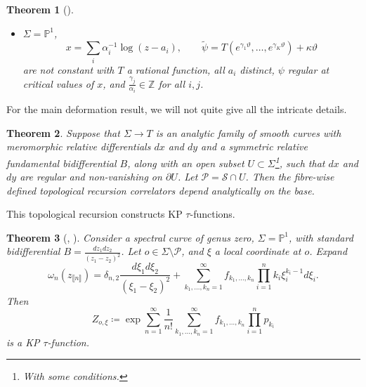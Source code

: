 \documentclass[10pt,a4paper,oneside,no-math,reqno]{amsart}%
\theoremstyle{plain}
\newtheorem{theorem}{Theorem}[section]
\theoremstyle{definition}
\theoremstyle{remark}
\numberwithin{equation}{section}
\renewcommand{\theta}{\vartheta}
\newcommand{\mb}[1]{\mathbb{#1}}
\newcommand{\mc}[1]{\mathcal{#1}}
\newcommand{\1}{\mathds{1}}
\newcommand{\Z}{\mb{Z}}
\renewcommand{\P}{\mb{P}}
\newcommand{\<}{\langle}
\renewcommand{\>}{\rangle}
\newcommand{\del}{\partial}
\begin{document}
\begin{theorem}[{\cite[Section 6]{ABDKS24}}]
\begin{itemize}
        are not constant with all $ a_i$ distinct and $ R $ a rational function which is regular at the $ a_i$. 
        \item $ \Sigma = \P^1$,
        \begin{equation}
            x
            = 
            \sum_i \alpha_i^{-1} \log (z - a_i),
            \qquad
            \tilde{\psi}  
            = 
            T ( e^{\gamma_1 \theta}, \dotsc, e^{\gamma_K \theta}) + \kappa \theta 
        \end{equation} 
        are not constant with $T $ a rational function, all $ a_i $ distinct, $ \psi $ regular at critical values of $ x$, and $ \frac{\gamma_j}{\alpha_i} \in \Z $ for all $ i,j$.
    \end{itemize}
\end{theorem}

For the main deformation result, we will not quite give all the intricate details.

\begin{theorem}\label{TRLimits}
    Suppose that $ \Sigma \to T $ is an analytic family of smooth curves with meromorphic relative differentials $ dx$ and $ dy$ and a symmetric relative fundamental bidifferential $ B$, along with an open subset $ U \subset \Sigma$\footnote{With some conditions.}, such that $ dx$ and $ dy $ are regular and non-vanishing on $ \del U$. Let $ \mc{P} = \mc{S} \cap U$. Then the fibre-wise defined topological recursion correlators depend analytically on the base.
\end{theorem}

This topological recursion constructs KP $\tau$-functions. 

\begin{theorem}[{\cite{ABDKS24KP0}, \cite[Theorem 6.4]{ABDKS25}}]
    Consider a spectral curve of genus zero, $ \Sigma = \P^1$, with standard bidifferential $ B = \frac{dz_1 dz_2}{(z_1 - z_2)^2}$. Let $ o \in \Sigma \setminus \mc{P}$, and $ \xi$ a local coordinate at $ o$. Expand
    \begin{equation}
        \omega_n (z_{\llbracket n \rrbracket} )
        =
        \delta_{n,2} \frac{d\xi_1 d\xi_2}{(\xi_1 - \xi_2)^2}
        +
        \sum_{k_1, \dotsc, k_n = 1}^\infty f_{k_1, \dotsc, k_n} \prod_{i=1}^n k_i \xi_i^{k_i-1} d\xi_i.
    \end{equation}
    Then
    \begin{equation}
        Z_{o,\xi}
        \coloneqq
        \exp \sum_{n=1}^\infty \frac{1}{n!} \sum_{k_1, \dotsc, k_n = 1}^\infty f_{k_1, \dotsc, k_n} \prod_{i=1}^n p_{k_i}
    \end{equation}
    is a KP $\tau$-function.
\end{theorem}
\end{document}
